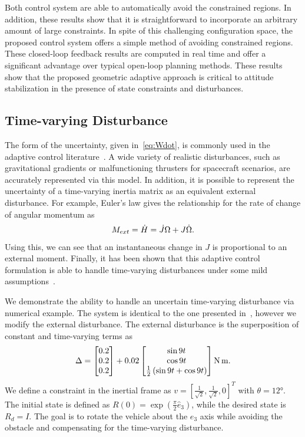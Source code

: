 Both control system are able to automatically avoid the constrained regions. 
In addition, these results show that it is straightforward to incorporate an arbitrary amount of large constraints.
In spite of this challenging configuration space, the proposed control system offers a simple method of avoiding constrained regions.
These closed-loop feedback results are computed in real time and offer a significant advantage over typical open-loop planning methods.
These results show that the proposed geometric adaptive approach is critical to attitude stabilization in the presence of state constraints and disturbances.

\subsection{Time-varying Disturbance}\label{ssec:time_varying}
The form of the uncertainty, given in~\cref{eq:Wdot}, is commonly used in the adaptive control literature~\cite{lee2011a,ioannou2012}. 
A wide variety of realistic disturbances, such as gravitational gradients or malfunctioning thrusters for spacecraft scenarios, are accurately represented via this model. 
In addition, it is possible to represent the uncertainty of a time-varying inertia matrix as an equivalent external disturbance. 
For example, Euler's law gives the relationship for the rate of change of angular momentum as
\begin{align*}
    M_{ext} = \dot{H} = \dot{J} \Omega + J \dot{\Omega} .
\end{align*}
Using this, we can see that an instantaneous change in \( J \) is proportional to an external moment.
Finally, it has been shown that this adaptive control formulation is able to handle time-varying disturbances under some mild assumptions~\cite{ioannou2012}. 

We demonstrate the ability to handle an uncertain time-varying disturbance via numerical example.
The system is identical to the one presented in~, however we modify the external disturbance. 
The external disturbance is the superposition of constant and time-varying terms as
\begin{align*}
    \Delta = \begin{bmatrix} 0.2 \\ 0.2 \\0.2 \end{bmatrix} + 0.02 \begin{bmatrix} \sin 9 t \\ \cos 9 t \\ \frac{1}{2} \left( \sin 9t + \cos 9t \right)\end{bmatrix} \si{\newton\meter}.
\end{align*}
We define a constraint in the inertial frame as \( v = [\frac{1}{\sqrt{2}}, \frac{1}{\sqrt{2}}, 0]^T \) with \( \theta = \ang{12} \).
The initial state is defined as \(R(0) = \exp( \frac{\pi}{2} \hat{e}_3) \), while the desired state is \(R_d =I \).
The goal is to rotate the vehicle about the \( e_3 \) axis while avoiding the obstacle and compensating for the time-varying disturbance. 

